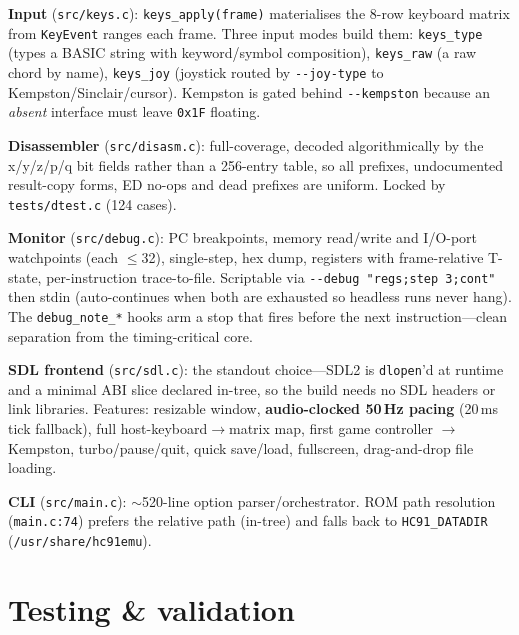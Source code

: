 \documentclass[11pt,a4paper]{article}
\begin{document}
\textbf{Input} (\texttt{src/keys.c}): \texttt{keys\_apply(frame)} materialises
the 8-row keyboard matrix from \texttt{KeyEvent} ranges each frame. Three input
modes build them: \texttt{keys\_type} (types a BASIC string with keyword/symbol
composition), \texttt{keys\_raw} (a raw chord by name), \texttt{keys\_joy}
(joystick routed by \texttt{-{}-joy-type} to Kempston/Sinclair/cursor).
Kempston is gated behind \texttt{-{}-kempston} because an \emph{absent}
interface must leave \texttt{0x1F} floating.

\textbf{Disassembler} (\texttt{src/disasm.c}): full-coverage, decoded
algorithmically by the x/y/z/p/q bit fields rather than a 256-entry table, so
all prefixes, undocumented result-copy forms, ED no-ops and dead prefixes are
uniform. Locked by \texttt{tests/dtest.c} (124 cases).

\textbf{Monitor} (\texttt{src/debug.c}): PC breakpoints, memory read/write and
I/O-port watchpoints (each $\leq$32), single-step, hex dump, registers with
frame-relative T-state, per-instruction trace-to-file. Scriptable via
\texttt{-{}-debug "regs;step 3;cont"} then stdin (auto-continues when both are
exhausted so headless runs never hang). The \texttt{debug\_note\_*} hooks arm a
stop that fires before the next instruction---clean separation from the
timing-critical core.

\textbf{SDL frontend} (\texttt{src/sdl.c}): the standout choice---SDL2 is
\texttt{dlopen}'d at runtime and a minimal ABI slice declared in-tree, so the
build needs no SDL headers or link libraries. Features: resizable window,
\textbf{audio-clocked 50\,Hz pacing} (20\,ms tick fallback), full
host-keyboard$\to$matrix map, first game controller $\to$ Kempston,
turbo/pause/quit, quick save/load, fullscreen, drag-and-drop file loading.

\textbf{CLI} (\texttt{src/main.c}): $\sim$520-line option parser/orchestrator.
ROM path resolution (\texttt{main.c:74}) prefers the relative path (in-tree)
and falls back to \texttt{HC91\_DATADIR} (\texttt{/usr/share/hc91emu}).

\section{Testing \& validation}
\end{document}
